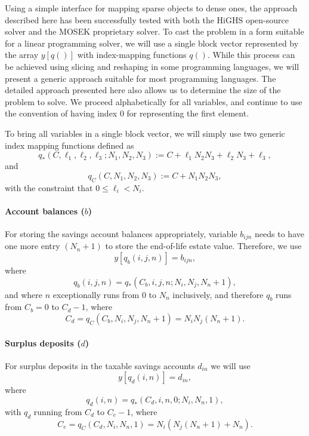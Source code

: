 \documentclass[fleqn,12pt]{report}
\begin{document}
Using a simple interface for mapping sparse objects to dense ones, the approach described here
has been successfully tested with both the HiGHS open-source solver
and the MOSEK proprietary solver.
To cast the problem in a form suitable for a linear programming solver, we will use
a single block vector represented by the array $y[q()]$ with index-mapping functions $q()$.
While this process can be achieved using slicing and reshaping in some programming
languages, we will present a generic approach suitable for most programming languages.
The detailed approach presented here also allows us to determine the size of the problem to solve.
We proceed alphabetically for all variables, and continue to use the convention of having
index 0 for representing the first element.

To bring all variables in a single block vector,
we will simply use two generic index mapping functions defined as
\begin{equation}
	q_*(C, \ell_1, \ell_2, \ell_3 ; N_1, N_2, N_3) :=
	C + \ell_1N_2N_3 + \ell_2N_3 + \ell_3 ,
\end{equation}
and
\begin{equation}
	q_C(C, N_1, N_2, N_3) :=
	C + N_1N_2N_3,
\end{equation}
with the constraint that $0 \le \ell_i < N_i$.

\paragraph*{Account balances (\boldmath$b$)}
For storing the savings account balances appropriately, variable $b_{ijn}$ needs to have one
more entry $(N_n + 1)$ to
store the end-of-life estate value. Therefore, we use
\begin{equation}
	y[q_b(i, j, n)] = b_{ijn},
\end{equation}
where
\begin{equation}
	\label{Eq:Extra}
	q_b(i, j, n) = q_*(C_b, i, j, n; N_i, N_j, N_n+1),
\end{equation}
and where $n$ exceptionally runs from 0 to $N_n$ inclusively, and therefore
$q_b$ runs from $C_b = 0$ to $C_{d} - 1$,
where
\[
	C_{d} = q_C(C_b, N_i, N_j, N_n+1) = N_i N_j (N_n+1).
\]

\paragraph*{Surplus deposits (\boldmath$d$)}
For surplus deposits in the taxable savings accounts $d_{in}$ we will use
\begin{equation}
	y[q_d(i, n)] = d_{in},
\end{equation}
where
\begin{equation}
	q_d(i, n) = q_*(C_d, i, n, 0; N_i, N_n, 1),
\end{equation}
with $q_d$ running from $C_d$ to $C_e - 1$, where
\[
	C_e = q_C(C_d, N_i, N_n, 1) = N_i(N_j(N_n+1) + N_n).
\]
\end{document}
